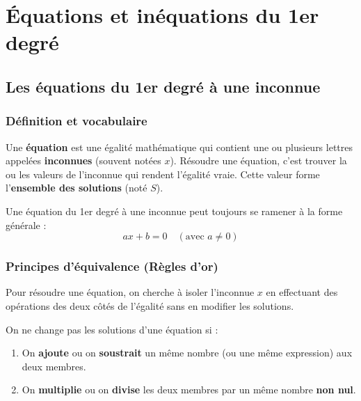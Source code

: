 \documentclass[../main.tex]{subfiles}
\newcommand{\SubfileStandaloneFlag}{}
\begin{document}
\ifdefined\SubfileStandaloneFlag
  \PageLegaleChapitre
\fi

\chapter{Équations et inéquations du 1er degré}
\label{chap:equations-inequations}

\section{Les équations du 1er degré à une inconnue}

\subsection{Définition et vocabulaire}

Une \textbf{équation} est une égalité mathématique qui contient une ou plusieurs lettres appelées \textbf{inconnues} (souvent notées $x$). Résoudre une équation, c'est trouver la ou les valeurs de l'inconnue qui rendent l'égalité vraie. Cette valeur forme l'\textbf{ensemble des solutions} (noté $S$).

\begin{definition}
Une équation du 1er degré à une inconnue peut toujours se ramener à la forme générale :
\[
ax + b = 0 \quad (\text{avec } a \neq 0)
\]
\end{definition}

\subsection{Principes d'équivalence (Règles d'or)}

Pour résoudre une équation, on cherche à isoler l'inconnue $x$ en effectuant des opérations des deux côtés de l'égalité sans en modifier les solutions.

\begin{propriete}
On ne change pas les solutions d'une équation si :
\begin{enumerate}[label=\textbf{(\arabic*)}]
  \item On \textbf{ajoute} ou on \textbf{soustrait} un même nombre (ou une même expression) aux deux membres.
  \item On \textbf{multiplie} ou on \textbf{divise} les deux membres par un même nombre \textbf{non nul}.
\end{enumerate}
\end{propriete}
\end{document}
